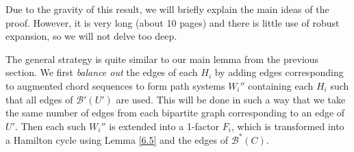\documentclass[10pt,letterpaper, reqno]{amsart}
\theoremstyle{definition}
\numberwithin{equation}{section}
\begin{document}
Due to the gravity of this result, we will briefly explain the main ideas of the proof. However, it is very long (about 10 pages) and there is little use of robust expansion, so we will not delve too deep. 

The general strategy is quite similar to our main lemma from the previous section. We first \textit{balance out} the edges of each $H_i$ by adding edges corresponding to augmented chord sequences to form path systems $W_i''$ containing each $H_i$ such that all edges of $\mathcal{B}'(U')$ are used. This will be done in such a way that we take the same number of edges from each bipartite graph corresponding to an edge of $U'$. Then each such $W_i''$ is extended into a 1-factor $F_i$, which is transformed into a Hamilton cycle using Lemma \ref{6.5} and the edges of $\mathcal{B}^*(C)$. 
\end{document}
